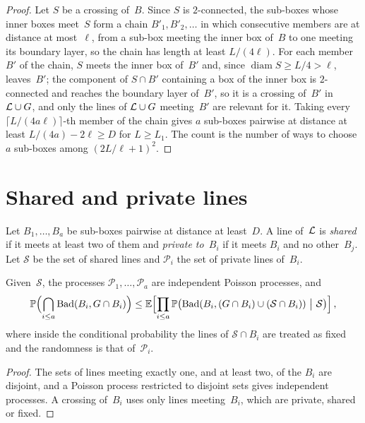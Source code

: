 \documentclass[11pt,letterpaper]{article}
\DeclareMathOperator{\diam}{diam}
\newcommand{\Bad}{\mathrm{Bad}}
\begin{document}
\begin{proof}
Let $S$ be a crossing of~$B$. Since $S$ is $2$-connected, the sub-boxes whose inner boxes meet~$S$ form a chain $B'_1,B'_2,\dots$ in which consecutive members are at distance at most~$\ell$, from a sub-box meeting the inner box of~$B$ to one meeting its boundary layer, so the chain has length at least $L/(4\ell)$. For each member $B'$ of the chain, $S$ meets the inner box of~$B'$ and, since $\diam S\ge L/4>\ell$, leaves~$B'$; the component of $S\cap B'$ containing a box of the inner box is $2$-connected and reaches the boundary layer of~$B'$, so it is a crossing of~$B'$ in $\mathcal L\cup G$, and only the lines of $\mathcal L\cup G$ meeting~$B'$ are relevant for it. Taking every $\lceil L/(4a\ell)\rceil$-th member of the chain gives $a$ sub-boxes pairwise at distance at least $L/(4a)-2\ell\ge D$ for $L\ge L_1$. The count is the number of ways to choose $a$ sub-boxes among $(2L/\ell+1)^2$.
\end{proof}

\section{Shared and private lines}
\label{sec:shared}

Let $B_1,\dots,B_a$ be sub-boxes pairwise at distance at least~$D$. A line of~$\mathcal L$ is \emph{shared} if it meets at least two of them and \emph{private to~$B_i$} if it meets $B_i$ and no other~$B_j$. Let $\mathcal S$ be the set of shared lines and $\mathcal P_i$ the set of private lines of~$B_i$.

\begin{lemma}
\label{lem:condind}
Given~$\mathcal S$, the processes $\mathcal P_1,\dots,\mathcal P_a$ are independent Poisson processes, and
\begin{equation}
\label{eq:condind}
  \P\Bigl(\bigcap_{i\le a}\Bad(B_i,G\cap B_i)\Bigr)\le\E\Bigl[\prod_{i\le a}\P\bigl(\Bad(B_i,(G\cap B_i)\cup(\mathcal S\cap B_i))\ \big\vert\ \mathcal S\bigr)\Bigr]\,,
\end{equation}
where inside the conditional probability the lines of $\mathcal S\cap B_i$ are treated as fixed and the randomness is that of~$\mathcal P_i$.
\end{lemma}

\begin{proof}
The sets of lines meeting exactly one, and at least two, of the $B_i$ are disjoint, and a Poisson process restricted to disjoint sets gives independent processes. A crossing of~$B_i$ uses only lines meeting~$B_i$, which are private, shared or fixed.
\end{proof}
\end{document}
